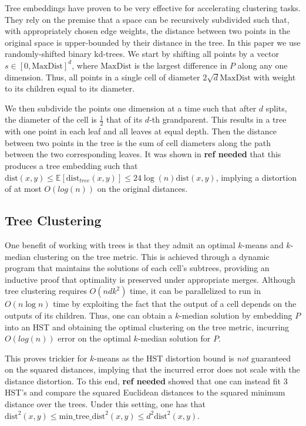 \documentclass{article}
\theoremstyle{definition}
\begin{document}
Tree embeddings have proven to be very effective for accelerating clustering tasks. They rely on the premise that a space can be recursively subdivided such
that, with appropriately chosen edge weights, the distance between two points in the original space is upper-bounded by their distance in the tree. In this
paper we use randomly-shifted binary kd-trees. We start by shifting all points by a vector $s \in [0, \text{MaxDist}]^d$, where $\text{MaxDist}$ is the largest
difference in $P$ along any one dimension. Thus, all points in a single cell of diameter $2\sqrt{d}\text{MaxDist}$ with weight to its children equal to its
diameter.

We then subdivide the points one dimension at a time such that after $d$ splits, the diameter of the cell is $\frac{1}{2}$ that of its $d$-th grandparent. This
results in a tree with one point in each leaf and all leaves at equal depth. Then the distance between two points in the tree is the sum of cell diameters along
the path between the two corresponding leaves. It was shown in \textbf{ref needed} that this produces a tree embedding such that $\text{dist}(x, y) \leq
\mathbb{E}[\text{dist}_{tree}(x, y)] \leq 24 \log(n) \text{dist}(x, y)$, implying a distortion of at most $O(log(n))$ on the original distances.

\subsection{Tree Clustering}

One benefit of working with trees is that they admit an optimal $k$-means and $k$-median clustering on the tree metric. This is achieved through a dynamic
program that maintains the solutions of each cell's subtrees, providing an inductive proof that optimality is preserved under appropriate merges. Although tree
clustering requires $O(ndk^2)$ time, it can be parallelized to run in $O(n\log n)$ time by exploiting the fact that the output of a cell depends on the outputs
of its children. Thus, one can obtain a $k$-median solution by embedding $P$ into an HST and obtaining the optimal clustering on the tree metric, incurring 
$O(log(n))$ error on the optimal $k$-median solution for $P$.

This proves trickier for $k$-means as the HST distortion bound is \emph{not} guaranteed on the squared distances, implying that the incurred error does not
scale with the distance distortion. To this end, \textbf{ref needed} showed that one can instead fit $3$ HST's and compare the squared Euclidean distances to
the squared minimum distance over the trees. Under this setting, one has that $\text{dist}^2(x, y) \leq \text{min\_tree\_dist}^2(x, y) \leq d^2 \text{dist}^2(x,
y)$.
\end{document}
